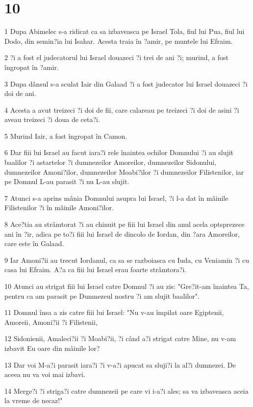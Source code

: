\chapter{10}

\par 1 Dupa Abimelec s-a ridicat ca sa izbaveasca pe Israel Tola, fiul lui Pua, fiul lui Dodo, din semin?ia lui Isahar. Acesta traia în ?amir, pe muntele lui Efraim.
\par 2 ?i a fost el judecatorul lui Israel douazeci ?i trei de ani ?i; murind, a fost îngropat în ?amir.
\par 3 Dupa dânsul s-a sculat Iair din Galaad ?i a fost judecator lui Israel douazeci ?i doi de ani.
\par 4 Acesta a avut treizeci ?i doi de fii, care calareau pe treizeci ?i doi de asini ?i aveau treizeci ?i doua de ceta?i.
\par 5 Murind Iair, a fost îngropat în Camon.
\par 6 Dar fiii lui Israel au facut iara?i rele înaintea ochilor Domnului ?i au slujit baalilor ?i astartelor ?i dumnezeilor Amoreilor, dumnezeilor Sidonului, dumnezeilor Amoni?ilor, dumnezeilor Moabi?ilor ?i dumnezeilor Filistenilor, iar pe Domnul L-au parasit ?i nu L-au slujit.
\par 7 Atunci s-a aprins mânia Domnului asupra lui Israel, ?i l-a dat în mâinile Filistenilor ?i în mâinile Amoni?ilor.
\par 8 Ace?tia au strâmtorat ?i au chinuit pe fiii lui Israel din anul acela optsprezece ani în ?ir, adica pe to?i fiii lui Israel de dincolo de Iordan, din ?ara Amoreilor, care este în Galaad.
\par 9 Iar Amoni?ii au trecut Iordanul, ca sa se razboiasca cu Iuda, cu Veniamin ?i cu casa lui Efraim. A?a ca fiii lui Israel erau foarte strâmtora?i.
\par 10 Atunci au strigat fiii lui Israel catre Domnul ?i au zis: "Gre?it-am înaintea Ta, pentru ca am parasit pe Dumnezeul nostru ?i am slujit baalilor".
\par 11 Domnul însa a zis catre fiii lui Israel: "Nu v-au împilat oare Egiptenii, Amoreii, Amoni?ii ?i Filistenii,
\par 12 Sidonienii, Amaleci?ii ?i Moabi?ii, ?i când a?i strigat catre Mine, nu v-am izbavit Eu oare din mâinile lor?
\par 13 Dar voi M-a?i parasit iara?i ?i v-a?i apucat sa sluji?i la al?i dumnezei. De aceea nu va voi mai izbavi.
\par 14 Merge?i ?i striga?i catre dumnezeii pe care vi i-a?i ales; sa va izbaveasca aceia la vreme de necaz!"
